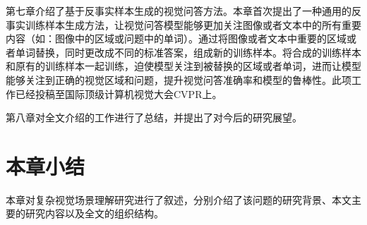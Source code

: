 \begin{asparaitem}
\item 第七章介绍了基于反事实样本生成的视觉问答方法。本章首次提出了一种通用的反事实训练样本生成方法，让视觉问答模型能够更加关注图像或者文本中的所有重要内容（如：图像中的区域或问题中的单词）。通过将图像或者文本中重要的区域或者单词替换，同时更改成不同的标准答案，组成新的训练样本。将合成的训练样本和原有的训练样本一起训练，迫使模型关注到被替换的区域或者单词，进而让模型能够关注到正确的视觉区域和问题，提升视觉问答准确率和模型的鲁棒性。此项工作已经投稿至国际顶级计算机视觉大会CVPR上。


\item 第八章对全文介绍的工作进行了总结，并提出了对今后的研究展望。

\end{asparaitem}


\section{本章小结}
本章对复杂视觉场景理解研究进行了叙述，分别介绍了该问题的研究背景、本文主要的研究内容以及全文的组织结构。
